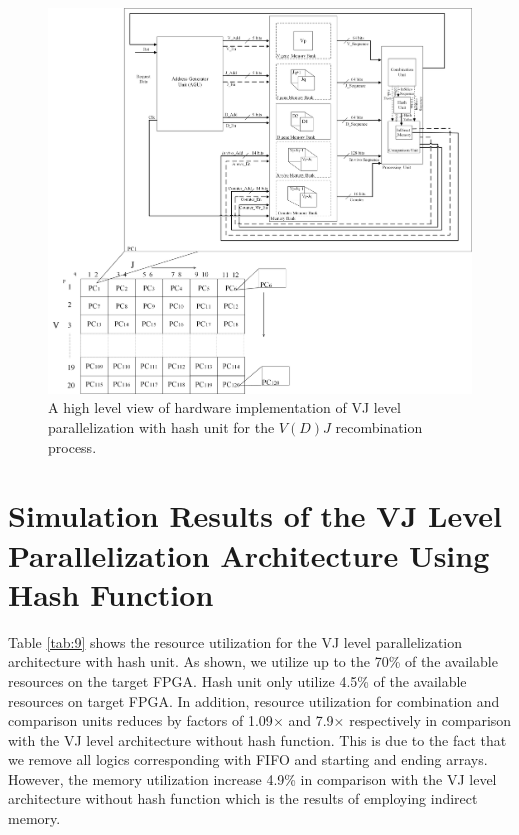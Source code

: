 \begin{figure}
\begin{center}
\includegraphics[clip,width=1\columnwidth]{Fig/VJLevel_HashFunction.jpg}
\caption{A high level view of hardware implementation of VJ level parallelization with hash unit for the $V(D)J$ recombination process.}
\label{fig:Hash_VJLevel}
\end{center}
\end{figure}
\section{Simulation Results of the VJ Level Parallelization Architecture Using Hash Function} \label{sec:simVJlevelHash}

Table \ref{tab:9} shows the resource utilization for the VJ level parallelization architecture with hash unit. As shown, we utilize up to the 70\% of the available resources on the target FPGA. Hash unit only utilize 4.5\% of the available resources on target FPGA. In addition, resource utilization for combination and comparison units reduces by  factors of 1.09$\times$ and 7.9$\times$ respectively in comparison with the VJ level architecture without hash function. This is due to the fact that we remove all logics corresponding with FIFO and starting and ending arrays. However, the memory utilization increase 4.9\% in comparison with the VJ level architecture without hash function which is the results of employing indirect memory.
 
